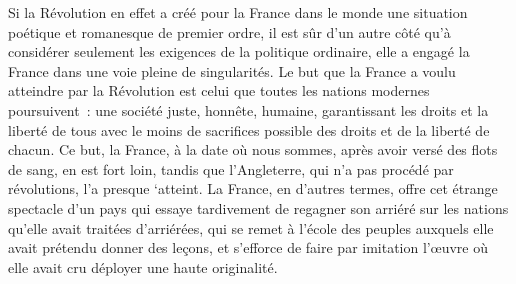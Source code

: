\documentclass[french,twoside]{book} %
\begin{document}
Si la Révolution en effet a créé pour la France dans le monde une situation poétique et romanesque de premier ordre, il est sûr d’un autre côté qu’à considérer seulement les exigences de la politique ordinaire, elle a engagé la France dans une voie pleine de singularités. Le but que la France a voulu atteindre par la Révolution est celui que toutes les nations modernes poursuivent : une société juste, honnête, humaine, garantissant les droits et la liberté de tous avec le moins de sacrifices possible des droits et de la liberté de chacun. Ce but, la France, à la date où nous sommes, après avoir versé des flots de sang, en est fort loin, tandis que l’Angleterre, qui n’a pas procédé par révolutions, l’a presque ‘atteint. La France, en d’autres termes, offre cet étrange spectacle d’un pays qui essaye tardivement de regagner son arriéré sur les nations qu’elle avait traitées d’arriérées, qui se remet à l’école des peuples auxquels elle avait prétendu donner des leçons, et s’efforce de faire par imitation l’œuvre où elle avait cru déployer une haute originalité.\par
\end{document}
